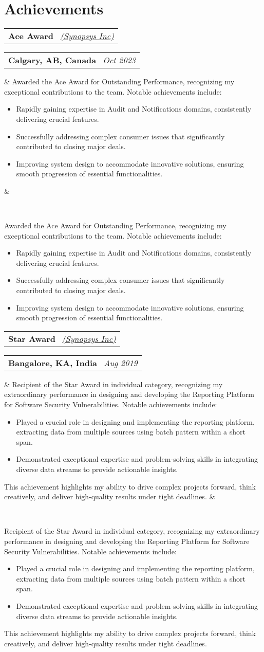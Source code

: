 \documentclass[14pt,a4paper,sans]{moderncv}
\makeatletter
\newcommand*{\customcventry}[7][.13em]{
    \begin{tabular}{@{}l}
    {\bfseries #4} \
        {\itshape #3}
    \end{tabular}
    \hfill
    \begin{tabular}{l@{}}
    {\bfseries #5} \
        {\itshape #2}
    \end{tabular}
    \ifx
        &#7&%
    \else
            {\
        \begin{minipage}{\maincolumnwidth}%
        \small#7%
        \end{minipage}}
    \fi%
    \par\addvspace{#1}}
\makeatother
\begin{document}
    \section{Achievements}
    \customcventry{Oct 2023}{{\color{blue}\href{https://www.synopsys.com/}{(Synopsys Inc)}}}{Ace Award}{Calgary, AB, Canada}{}{
            {Awarded the Ace Award for Outstanding Performance, recognizing my exceptional contributions to the team. Notable achievements include:}
            {\begin{itemize}[leftmargin=0.6cm, label={\textbullet}]
                 \item Rapidly gaining expertise in Audit and Notifications domains, consistently delivering crucial features.
                 \item Successfully addressing complex consumer issues that significantly contributed to closing major deals.
                 \item Improving system design to accommodate innovative solutions, ensuring smooth progression of essential functionalities.
        \end{itemize}}
        \text{This achievement showcases my ability to adapt quickly, think critically, and drive results.}
    }

    \vspace{1em}

    \customcventry{Aug 2019}
    {{\color{blue}\href{https://www.synopsys.com/}{(Synopsys Inc)}}}{Star Award}{Bangalore, KA, India}{}{
            {Recipient of the Star Award in individual category, recognizing my extraordinary performance in designing and developing the Reporting Platform for Software Security Vulnerabilities. Notable achievements include:}
            {\begin{itemize}[leftmargin=0.6cm, label={\textbullet}]
                 \item Played a crucial role in designing and implementing the reporting platform, extracting data from multiple sources using batch pattern within a short span.
                 \item Demonstrated exceptional expertise and problem-solving skills in integrating diverse data streams to provide actionable insights.
        \end{itemize}}
            {This achievement highlights my ability to drive complex projects forward, think creatively, and deliver high-quality results
        under tight deadlines.}
    }
\end{document}
